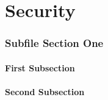 \documentclass[./FDA_document_template.tex]{subfiles}
\begin{document}
\renewcommand{\onlyinsubfile}[1]{#1}
\renewcommand{\notinsubfile}[1]{}
 
\setcounter{part}{8}
\pagestyle{Standard}

\part{Security}
 
 
 
 \section{Subfile Section One}

\lipsum[1]

\subsection{First Subsection}

\lipsum[2]

\subsection{Second Subsection}

\lipsum[3]

\bigskip
 
\end{document}
